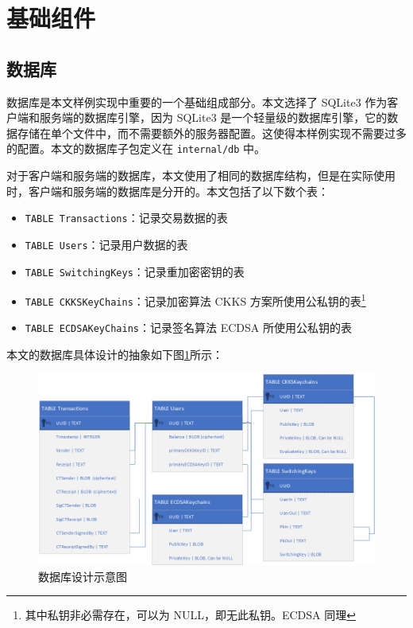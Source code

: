 \section{基础组件}

\subsection{数据库}

数据库是本文样例实现中重要的一个基础组成部分。本文选择了 SQLite3 作为客户端和服务端的数据库引擎，因为 SQLite3 是一个轻量级的数据库引擎，它的数据存储在单个文件中，而不需要额外的服务器配置。这使得本样例实现不需要过多的配置。本文的数据库子包定义在 \verb|internal/db| 中。

对于客户端和服务端的数据库，本文使用了相同的数据库结构，但是在实际使用时，客户端和服务端的数据库是分开的。本文包括了以下数个表：

\begin{itemize}
    \item \verb|TABLE Transactions|：记录交易数据的表
    \item \verb|TABLE Users|：记录用户数据的表
    \item \verb|TABLE SwitchingKeys|：记录重加密密钥的表
    \item \verb|TABLE CKKSKeyChains|：记录加密算法 CKKS 方案所使用公私钥的表\footnote{其中私钥非必需存在，可以为 NULL，即无此私钥。ECDSA 同理}
    \item \verb|TABLE ECDSAKeyChains|：记录签名算法 ECDSA 所使用公私钥的表
\end{itemize}

本文的数据库具体设计的抽象如下图\ref*{Fig:Database}所示：

\begin{figure}[ht]
    \centering
    \includegraphics[width=\linewidth]{Figures/chimata-database-design.png}
    \caption{数据库设计示意图}\label{Fig:Database}
\end{figure}

